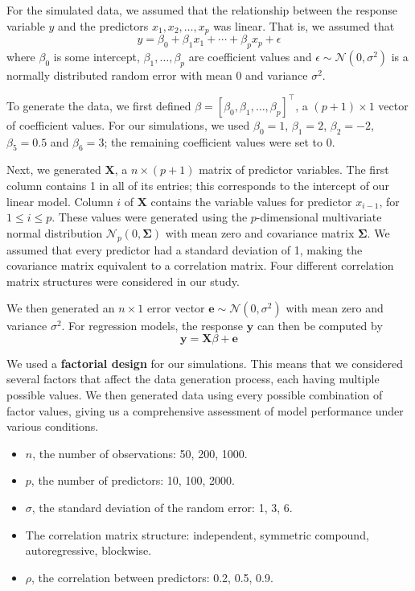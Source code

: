 \documentclass{article}
\begin{document}
For the simulated data, we assumed that the relationship between the response variable $y$ and the predictors $x_1, x_2, \dotsc, x_p$ was linear. That is, we assumed that
\begin{equation}
	y = \beta_0 + \beta_1 x_1 + \cdots + \beta_p x_p + \epsilon
\end{equation}
where $\beta_0$ is some intercept, $\beta_1, \dotsc, \beta_p$ are coefficient values and $\epsilon\sim \mathcal{N}(0, \sigma^2)$ is a normally distributed random error with mean 0 and variance $\sigma^2$.

To generate the data, we first defined $\beta = [\beta_0, \beta_1, \dotsc, \beta_p]^\top$, a $(p + 1)\times 1$ vector of coefficient values. For our simulations, we used $\beta_0 = 1$, $\beta_1 = 2$, $\beta_2 = -2$, $\beta_5=0.5$ and $\beta_6 = 3$; the remaining coefficient values were set to 0.

Next, we generated $\mathbf{X}$, a $n\times (p + 1)$ matrix of predictor variables. The first column contains 1 in all of its entries; this corresponds to the intercept of our linear model. Column $i$ of $\mathbf{X}$ contains the variable values for predictor $x_{i - 1}$, for $1\leq i\leq p$. These values were generated using the $p$-dimensional multivariate normal distribution $\mathcal{N}_p(0, \mathbf{\Sigma})$ with mean zero and covariance matrix $\mathbf{\Sigma}$. We assumed that every predictor had a standard deviation of 1, making the covariance matrix equivalent to a correlation matrix. Four different correlation matrix structures were considered in our study.

We then generated an $n\times 1$ error vector $\mathbf{e}\sim \mathcal{N}(0, \sigma^2)$ with mean zero and variance $\sigma^2$. For regression models, the response $\mathbf{y}$ can then be computed by
\begin{equation}
	\mathbf{y} = \mathbf{X}\beta + \mathbf{e}
\end{equation}

We used a \textbf{factorial design} for our simulations. This means that we considered several factors that affect the data generation process, each having multiple possible values. We then generated data using every possible combination of factor values, giving us a comprehensive assessment of model performance under various conditions.
\begin{itemize}
	\item $n$, the number of observations: 50, 200, 1000.
	\item $p$, the number of predictors: 10, 100, 2000.
	\item $\sigma$, the standard deviation of the random error: 1, 3, 6.
	\item The correlation matrix structure: independent, symmetric compound, autoregressive, blockwise.
	\item $\rho$, the correlation between predictors: 0.2, 0.5, 0.9.
\end{itemize}
\end{document}
